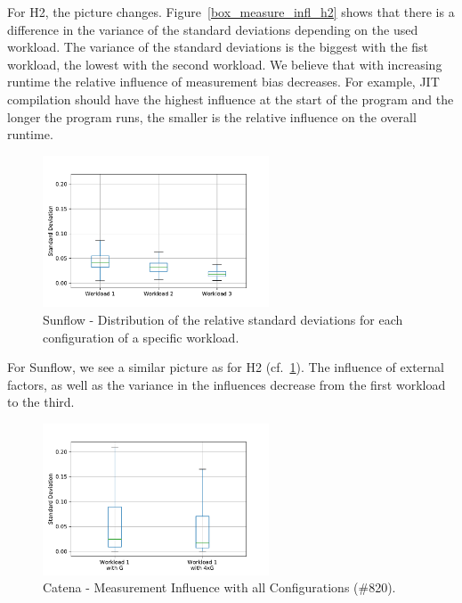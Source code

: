 For H2, the picture changes. Figure~\ref{box_measure_infl_h2} shows that there is a difference in the variance of the standard deviations depending on the used workload. The variance of the standard deviations is the biggest with the fist workload, the lowest with the second workload. We believe that with increasing runtime the relative influence of measurement bias decreases. For example, JIT compilation should have the highest influence at the start of the program and the longer the program runs, the smaller is the relative influence on the overall runtime.

\begin{figure}[h]
  \centering
  \includegraphics[width=0.6\textwidth]{images/sunflow_m_infl_wl_012}
  \caption{Sunflow - Distribution of the relative standard deviations for each configuration of a specific workload.}
  \label{box_measure_infl_sunflow}
\end{figure}

For Sunflow, we see a similar picture as for H2 (cf.~\ref{box_measure_infl_sunflow}). The influence of external factors, as well as the variance in the influences decrease from the first workload to the third.

\begin{figure}[h]
  \centering
  \includegraphics[width=0.6\textwidth]{images/catena_m_infl_wl_and_wlx4_0}
  \caption{Catena - Measurement Influence with all Configurations (\#820).}
  \label{box_measure_infl_catena_x4}
\end{figure}

